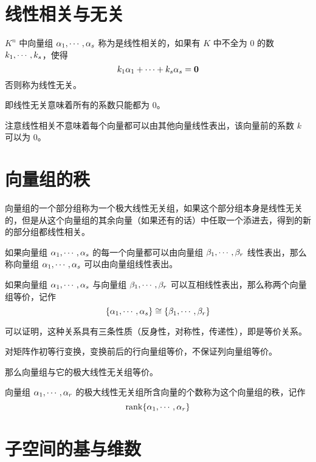 \section{线性相关与无关}

\begin{definition}
	$K^n$ 中向量组 $\alpha_1,\cdots,\alpha_s$ 称为是线性相关的，如果有 $K$ 中不全为 $0$ 的数 $k_1,\cdots,k_s$，使得
	\[k_1\alpha_1+\cdots+k_s\alpha_s=\boldsymbol{0}\]
	否则称为线性无关。
\end{definition}

即线性无关意味着所有的系数只能都为 $0$。

注意线性相关不意味着每个向量都可以由其他向量线性表出，该向量前的系数 $k$ 可以为 $0$。

\section{向量组的秩}

\begin{definition}[极大线性无关组]
	向量组的一个部分组称为一个极大线性无关组，如果这个部分组本身是线性无关的，但是从这个向量组的其余向量（如果还有的话）中任取一个添进去，得到的新的部分组都线性相关。
\end{definition}

如果向量组 $\alpha_1,\cdots,\alpha_s$ 的每一个向量都可以由向量组 $\beta_1,\cdots,\beta_r$ 线性表出，那么称向量组 $\alpha_1,\cdots,\alpha_s$ 可以由向量组线性表出。

\begin{definition}
	如果向量组 $\alpha_1,\cdots,\alpha_s$ 与向量组 $\beta_1,\cdots,\beta_r$ 可以互相线性表出，那么称两个向量组等价，记作
	\[\{\alpha_1,\cdots,\alpha_s\} \cong \{\beta_1,\cdots,\beta_r\}\]
\end{definition}

可以证明，这种关系具有三条性质（反身性，对称性，传递性），即是等价关系。

对矩阵作初等行变换，变换前后的行向量组等价，不保证列向量组等价。

那么向量组与它的极大线性无关组等价。

\begin{definition}
	向量组 $\alpha_1,\cdots,\alpha_r$ 的极大线性无关组所含向量的个数称为这个向量组的秩，记作
	\[\operatorname{rank}\{\alpha_1,\cdots,\alpha_r\}\]
\end{definition}

\section{子空间的基与维数}

